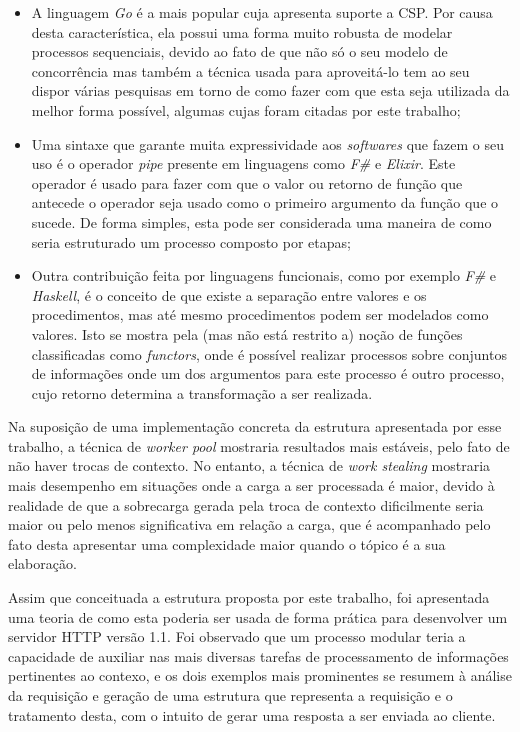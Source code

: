 \documentclass[12pt]{article}
\begin{document}
  \begin{itemize}
    \item A linguagem \textit{Go} é a mais popular cuja apresenta suporte a CSP. Por causa desta característica, ela possui uma forma muito robusta de modelar processos sequenciais, devido ao fato de que não só o seu modelo de concorrência mas também a técnica usada para aproveitá-lo tem ao seu dispor várias pesquisas em torno de como fazer com que esta seja utilizada da melhor forma possível, algumas cujas foram citadas por este trabalho;
    \item Uma sintaxe que garante muita expressividade aos \textit{softwares} que fazem o seu uso é o operador \textit{pipe} presente em linguagens como \textit{F\#} e \textit{Elixir}. Este operador é usado para fazer com que o valor ou retorno de função que antecede o operador seja usado como o primeiro argumento da função que o sucede. De forma simples, esta pode ser considerada uma maneira de como seria estruturado um processo composto por etapas;
    \item Outra contribuição feita por linguagens funcionais, como por exemplo \textit{F\#} e \textit{Haskell}, é o conceito de que existe a separação entre valores e os procedimentos, mas até mesmo procedimentos podem ser modelados como valores. Isto se mostra pela (mas não está restrito a) noção de funções classificadas como \textit{functors}, onde é possível realizar processos sobre conjuntos de informações onde um dos argumentos para este processo é outro processo, cujo retorno determina a transformação a ser realizada.
  \end{itemize}
  
  Na suposição de uma implementação concreta da estrutura apresentada por esse trabalho, a técnica de \textit{worker pool} mostraria resultados mais estáveis, pelo fato de não haver trocas de contexto. No entanto, a técnica de \textit{work stealing} mostraria mais desempenho em situações onde a carga a ser processada é maior, devido à realidade de que a sobrecarga gerada pela troca de contexto dificilmente seria maior ou pelo menos significativa em relação a carga, que é acompanhado pelo fato desta apresentar uma complexidade maior quando o tópico é a sua elaboração.
  
  Assim que conceituada a estrutura proposta por este trabalho, foi apresentada uma teoria de como esta poderia ser usada de forma prática para desenvolver um servidor HTTP versão 1.1. Foi observado que um processo modular teria a capacidade de auxiliar nas mais diversas tarefas de processamento de informações pertinentes ao contexo, e os dois exemplos mais prominentes se resumem à análise da requisição e geração de uma estrutura que representa a requisição e o tratamento desta, com o intuito de gerar uma resposta a ser enviada ao cliente.
  
\end{document}
